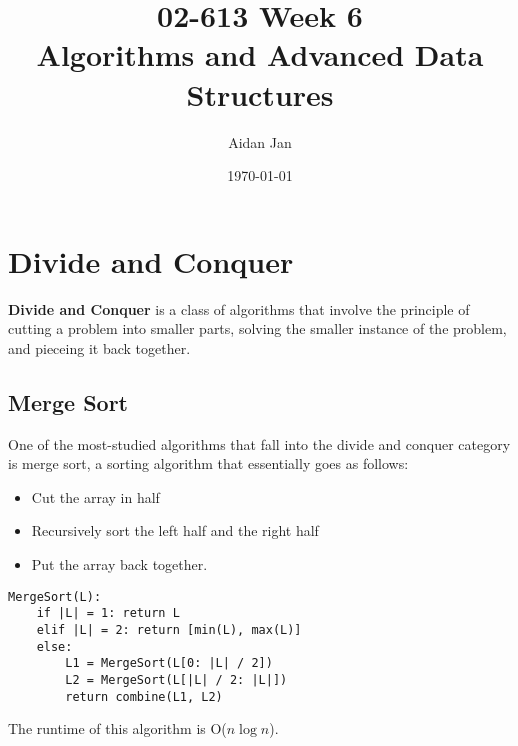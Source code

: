 \documentclass[10pt]{article}
\title{02-613 Week 6 \\ \large{Algorithms and Advanced Data Structures}}
\author{Aidan Jan}
\date{\today}
\begin{document}
\maketitle

\section*{Divide and Conquer}
\textbf{Divide and Conquer} is a class of algorithms that involve the principle of cutting a problem into smaller parts, solving the smaller instance of the problem, and pieceing it back together.

\subsection*{Merge Sort}
One of the most-studied algorithms that fall into the divide and conquer category is merge sort, a sorting algorithm that essentially goes as follows:
\begin{itemize}
    \item Cut the array in half
    \item Recursively sort the left half and the right half
    \item Put the array back together.
\end{itemize}
\begin{verbatim}
MergeSort(L):
    if |L| = 1: return L
    elif |L| = 2: return [min(L), max(L)]
    else:
        L1 = MergeSort(L[0: |L| / 2])
        L2 = MergeSort(L[|L| / 2: |L|])
        return combine(L1, L2)
\end{verbatim}
The runtime of this algorithm is O($n \log n$).
\end{document}
